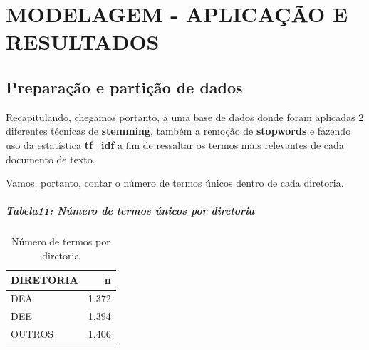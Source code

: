 \documentclass[]{article}
\newenvironment{Shaded}{\begin{snugshade}}{\end{snugshade}}
\newcommand{\KeywordTok}[1]{\textcolor[rgb]{0.13,0.29,0.53}{\textbf{#1}}}
\newcommand{\DataTypeTok}[1]{\textcolor[rgb]{0.13,0.29,0.53}{#1}}
\newcommand{\StringTok}[1]{\textcolor[rgb]{0.31,0.60,0.02}{#1}}
\newcommand{\OperatorTok}[1]{\textcolor[rgb]{0.81,0.36,0.00}{\textbf{#1}}}
\newcommand{\NormalTok}[1]{#1}
\let\oldsubparagraph\subparagraph
\renewcommand{\subparagraph}[1]{\oldsubparagraph{#1}\mbox{}}
\begin{document}
\section{MODELAGEM - APLICAÇÃO E
RESULTADOS}\label{modelagem---aplicacao-e-resultados}

\subsection{Preparação e partição de
dados}\label{preparacao-e-particao-de-dados}

Recapitulando, chegamos portanto, a uma base de dados donde foram
aplicadas 2 diferentes técnicas de \textbf{stemming}, também a remoção
de \textbf{stopwords} e fazendo uso da estatística \textbf{tf\_idf} a
fim de ressaltar os termos mais relevantes de cada documento de texto.

Vamos, portanto, contar o número de termos únicos dentro de cada
diretoria.

\subparagraph{Tabela11: Número de termos únicos por
diretoria}\label{tabela11-numero-de-termos-unicos-por-diretoria}

\begin{Shaded}
\end{Shaded}

\begin{table}[!h]

\caption{\label{tab:unnamed-chunk-71}Número de termos por diretoria}
\centering
\begin{tabular}{lr}
\toprule
DIRETORIA & n\\
\midrule
\rowcolor{gray!6}  DEA & 1.372\\
DEE & 1.394\\
\rowcolor{gray!6}  OUTROS & 1.406\\
\bottomrule
\end{tabular}
\end{table}
\end{document}
